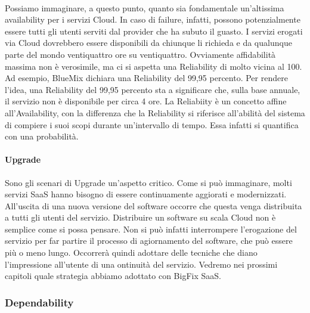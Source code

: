 \paragraph{}
Possiamo immaginare, a questo punto, quanto sia fondamentale un'altissima availability per i servizi Cloud. In caso di failure, infatti, possono potenzialmente essere tutti gli utenti serviti dal provider che ha subuto il guasto. I servizi erogati via Cloud dovrebbero essere disponibili da chiunque li richieda e da qualunque parte del mondo ventiquattro ore su ventiquattro. Ovviamente affidabilità massima non è verosimile, ma ci si aspetta una Reliability di molto vicina al 100. Ad esempio, BlueMix dichiara una Reliability del 99,95 percento. Per rendere l'idea, una Reliability del 99,95 percento sta a significare che, sulla base annuale, il servizio non è disponibile per circa 4 ore. La Reliabiity è un concetto affine all'Availability, con la differenza che la Reliability si riferisce all'abilità del sistema di compiere i suoi scopi durante un'intervallo di tempo. Essa infatti si quantifica con una probabilità.

\paragraph{Upgrade}
Sono gli scenari di Upgrade un'aspetto critico. Come si può immaginare, molti servizi SaaS hanno bisogno di essere continuamente aggiorati e modernizzati. All'uscita di una nuova versione del software occorre che questa venga distribuita a tutti gli utenti del servizio. Distribuire un software su scala Cloud non è semplice come si possa pensare. Non si può infatti interrompere l'erogazione del servizio per far partire il processo di agiornamento del software, che può essere più o meno lungo. Occorrerà quindi adottare delle tecniche che diano l'impressione all'utente di una ontinuità del servizio. Vedremo nei prossimi capitoli quale strategia abbiamo adottato con BigFix SaaS. 

\subsubsection{Dependability}

